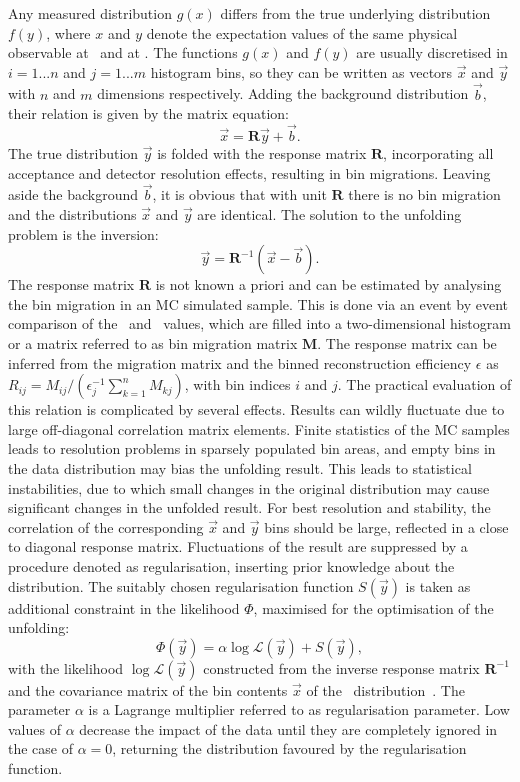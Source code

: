 Any measured distribution $g(x)$ differs from the true underlying distribution $f(y)$, where $x$ and $y$ denote the expectation values of the same physical observable at \recol\ and at \truelevel. The functions $g(x)$ and $f(y)$ are usually discretised in $i=1...n$ and $j=1...m$ histogram bins, so they can be written as vectors $\vec{x}$ and $\vec{y}$ with $n$ and $m$ dimensions respectively. Adding the background distribution $\vec{b}$, their relation is given by the matrix equation:
\[
\vec{x}=\boldsymbol{R}\vec{y} +\vec{b}.
\label{eq:folded}
\]
The true distribution $\vec{y}$ is folded with the response matrix $\mathbf{R}$, incorporating all acceptance and detector resolution effects, resulting in bin migrations. Leaving aside the background $\vec{b}$, it is obvious that with unit $\mathbf{R}$ there is no bin migration and the distributions $\vec{x}$ and $\vec{y}$ are identical. The solution to the unfolding problem is the inversion:
\[
\vec{y}=\boldsymbol{R}^{-1}(\vec{x} - \vec{b}).
\label{eq:unfolded}
\]
The response matrix $\mathbf{R}$ is not known a priori and can be estimated by analysing the bin migration in an \gls{MC} simulated sample. This is done via an event by event comparison of the \recol\ and \truelevel\ values, which are filled into a two-dimensional histogram or a matrix referred to as bin migration matrix $\mathbf{M}$. The response matrix can be inferred from the migration matrix and the binned reconstruction efficiency $\epsilon$ as $R_{ij}=M_{ij}/(\epsilon^{-1}_{j}\sum^n_{k=1}M_{kj})$, with bin indices $i$ and $j$.
%
The practical evaluation of this relation is complicated by several effects. Results can wildly fluctuate due to large off-diagonal correlation matrix elements. Finite statistics of the \gls{MC} samples leads to resolution problems in sparsely populated bin areas, and empty bins in the data distribution may bias the unfolding result. This leads to statistical instabilities, due to which small changes in the original distribution may cause significant changes in the unfolded result. For best resolution and stability, the correlation of the corresponding $\vec{x}$ and $\vec{y}$ bins should be large, reflected in a close to diagonal response matrix. 
%
Fluctuations of the result are suppressed by a procedure denoted as regularisation, inserting prior knowledge about the distribution. The suitably chosen regularisation function $S(\vec{y})$ is taken as additional constraint in the likelihood $\Phi$, maximised for the optimisation of the unfolding:
\[
\Phi(\vec{y})=\alpha \log{\mathcal{L}(\vec{y})}+S(\vec{y}),
\]
with the likelihood $\log{\mathcal{L}(\vec{y})}$ constructed from the inverse response matrix $\boldsymbol{R}^{-1}$ and the covariance matrix of the bin contents $\vec{x}$ of the \recolevel\ distribution~\cite{CowanBook}. The parameter $\alpha$ is a Lagrange multiplier referred to as regularisation parameter. Low values of $\alpha$ decrease the impact of the data until they are completely ignored in the case of $\alpha=0$, returning the distribution favoured by the regularisation function.


